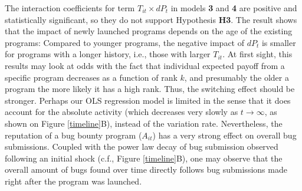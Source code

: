The interaction coefficients for term $T_{it} \times dP_t$ in models {\bf 3} and {\bf 4} are positive and statistically significant, so they do not support Hypothesis {\bf H3}. The result shows that the impact of newly launched programs depends on the age of the existing programs: Compared to younger programs, the negative impact of $dP_t$ is smaller for programs with a longer history, i.e., those with larger $T_{it}$. At first sight, this results may look at odds with the fact that individual expected payoff from a specific program decreases as a function of rank $k$, and presumably the older a program the more likely it has a high rank. Thus, the switching effect should be stronger. Perhaps our OLS regression model is limited in the sense that it does account for the absolute activity (which decreases very slowly as $t \rightarrow \infty$, as shown on Figure \ref{timeline}B), instead of the variation rate. Nevertheless, the reputation of a bug bounty program ($A_{it}$) has a very strong effect on overall bug submissions. Coupled with the power law decay of bug submission observed following an initial shock (c.f., Figure \ref{timeline}B), one may observe that the overall amount of bugs found over time directly follows bug submissions made right after the program was launched.

